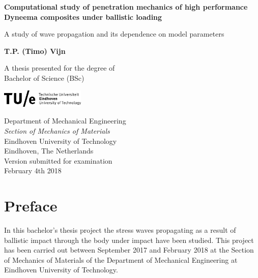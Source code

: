 


\begin{titlepage}
    \begin{center}
        \vspace*{1cm}
        
        \textbf{Computational study of penetration mechanics of high performance\\Dyneema composites under ballistic loading}
        
        \vspace{0.5cm}
        A study of wave propagation and its dependence on model parameters
        
        \vspace{1.5cm}
        
        \textbf{T.P. (Timo) Vijn}
        
        \vfill
        
        A thesis presented for the degree of\\
        Bachelor of Science (BSc)
        
        \vspace{0.8cm}
        
        \includegraphics[width=0.3\textwidth]{tue}
        
        \vspace{0.6cm}
        
        Department of Mechanical Engineering\\
        \textit{Section of Mechanics of Materials}\\
        Eindhoven University of Technology\\
        Eindhoven, The Netherlands\\
        \textcolor{MaterialRedA400}{Version submitted for examination}\\
        February 4th 2018
        
    \end{center}
\end{titlepage}
\newpage
\section*{Preface}
In this bachelor’s thesis project the stress waves propagating as a result of ballistic impact through the body under impact have been studied. This project has been carried out between September 2017 and February 2018 at the Section of Mechanics of Materials of the Department of Mechanical Engineering at Eindhoven University of Technology.

